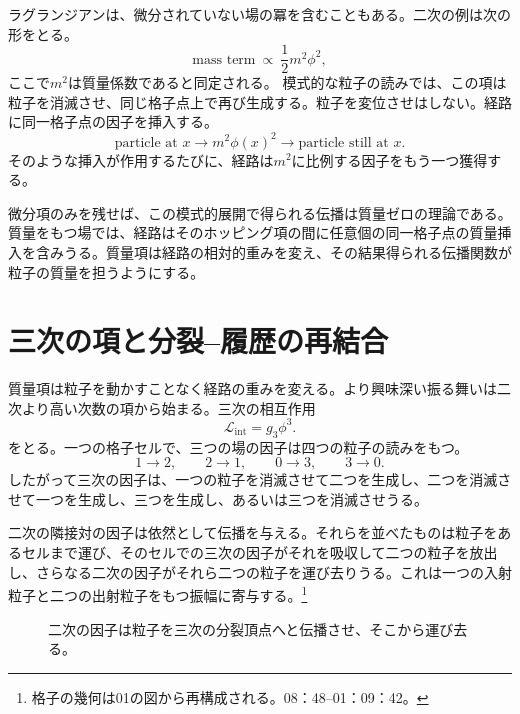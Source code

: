 ラグランジアンは、微分されていない場の冪を含むこともある。二次の例は次の形をとる。
\begin{equation}
\text{mass term}\ \propto\ \frac{1}{2}m^2\phi^2,
\end{equation}
ここで\(m^2\)は質量係数であると同定される。 模式的な粒子の読みでは、この項は粒子を消滅させ、同じ格子点上で再び生成する。粒子を変位させはしない。経路に同一格子点の因子を挿入する。
\begin{equation}
\text{particle at }x
\longrightarrow
\boxed{m^2\phi(x)^2}
\longrightarrow
\text{particle still at }x.
\end{equation}
そのような挿入が作用するたびに、経路は\(m^2\)に比例する因子をもう一つ獲得する。

微分項のみを残せば、この模式的展開で得られる伝播は質量ゼロの理論である。質量をもつ場では、経路はそのホッピング項の間に任意個の同一格子点の質量挿入を含みうる。質量項は経路の相対的重みを変え、その結果得られる伝播関数が粒子の質量を担うようにする。

\section{三次の項と分裂--履歴の再結合}

質量項は粒子を動かすことなく経路の重みを変える。より興味深い振る舞いは二次より高い次数の項から始まる。三次の相互作用
\begin{equation}
\mathcal{L}_{\mathrm{int}}=g_3\phi^3.
\end{equation}
をとる。一つの格子セルで、三つの場の因子は四つの粒子の読みをもつ。
\begin{equation}
1\longrightarrow 2,
\qquad
2\longrightarrow 1,
\qquad
0\longrightarrow 3,
\qquad
3\longrightarrow 0.
\end{equation}
したがって三次の因子は、一つの粒子を消滅させて二つを生成し、二つを消滅させて一つを生成し、三つを生成し、あるいは三つを消滅させうる。

二次の隣接対の因子は依然として伝播を与える。それらを並べたものは粒子をあるセルまで運び、そのセルでの三次の因子がそれを吸収して二つの粒子を放出し、さらなる二次の因子がそれら二つの粒子を運び去りうる。これは一つの入射粒子と二つの出射粒子をもつ振幅に寄与する。\footnote{格子の幾何は01の図から再構成される。08：48--01：09：42。}

\begin{figure}[htbp]
\centering
{}
\caption{二次の因子は粒子を三次の分裂頂点へと伝播させ、そこから運び去る。}
\end{figure}

